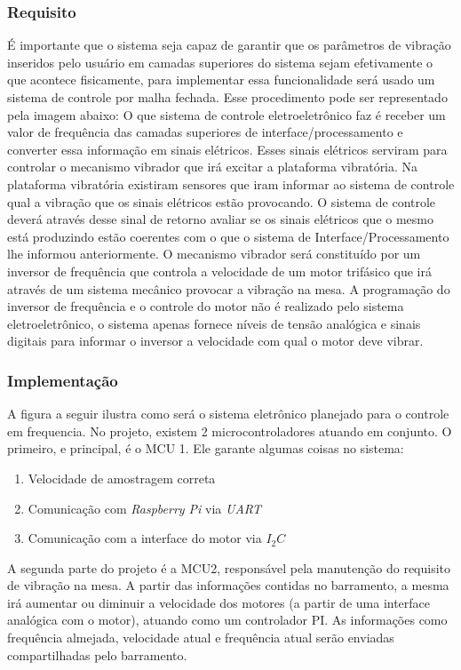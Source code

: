 \subsubsection{Requisito}
É importante que o sistema seja capaz de garantir que os parâmetros de vibração inseridos pelo usuário em camadas superiores do sistema sejam efetivamente o que acontece fisicamente, para implementar essa funcionalidade será usado um sistema de controle por malha fechada. Esse procedimento pode ser representado pela imagem abaixo: 
O que sistema de controle eletroeletrônico faz é receber um valor de frequência das camadas superiores de interface/processamento e converter essa informação em sinais elétricos. Esses sinais elétricos serviram para controlar o mecanismo vibrador que irá excitar a plataforma vibratória. Na plataforma vibratória existiram sensores que iram informar ao sistema de controle qual a vibração que os sinais elétricos estão provocando. O sistema de controle deverá através desse sinal de retorno avaliar se os sinais elétricos que o mesmo está produzindo estão coerentes com o que o sistema de Interface/Processamento lhe informou anteriormente. O mecanismo vibrador será constituído por um inversor de frequência que controla a velocidade de um motor trifásico que irá através de um sistema mecânico provocar a vibração na mesa. A programação do inversor de frequência e o controle do motor não é realizado pelo sistema eletroeletrônico, o sistema apenas fornece níveis de tensão analógica e sinais digitais para informar o inversor a velocidade com qual o motor deve vibrar.
\subsubsection{Implementação}
A figura a seguir ilustra como será o sistema eletrônico planejado para o controle em frequencia. No projeto, existem 2 microcontroladores atuando em conjunto. O primeiro, e principal, é o MCU 1. Ele garante algumas coisas no sistema:
\begin{enumerate}
\item Velocidade de amostragem correta
\item Comunicação com \textit{Raspberry Pi} via \textit{UART}
\item Comunicação com a interface do motor via \textit{$I_{2} C$}
\end{enumerate}
A segunda parte do projeto é a MCU2, responsável pela manutenção do requisito de vibração na mesa. A partir das informações contidas no barramento, a mesma irá aumentar ou diminuir a velocidade dos motores (a partir de uma interface analógica com o motor), atuando como um controlador PI. As informações como frequência almejada, velocidade atual e frequência atual serão enviadas compartilhadas pelo barramento.
